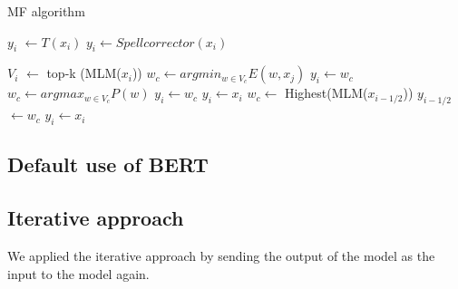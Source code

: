 \begin{algorithm}[t]
\caption{MF algorithm}
\label{alg:mf}
\begin{algorithmic}[1]
		\STATE $y_i$  $\longleftarrow T(x_i)$\;
	        \STATE $y_i\longleftarrow Spellcorrector(x_i)$\;
	               
	    \ELSE
	        \STATE $V_i$  $\longleftarrow$ top-k (MLM($x_i$))\;
	        \STATE $w_c \longleftarrow argmin_{w\in V_c}E(w,x_j)$ \;
	        	\STATE $y_i \longleftarrow w_c$ \;
	        \ENDIF        
	        \STATE $w_c \longleftarrow argmax_{w\in V_c}P(w)$ \;
	        	\STATE $y_i \longleftarrow w_c$ \;
	        \ELSE
	            \STATE $y_i \longleftarrow x_i$
	        \ENDIF
	    \ENDIF
	    \STATE $w_c \longleftarrow$ Highest(MLM($x_{i-1/2}$))\;
	    	\STATE $y_{i-1/2}$ $ \longleftarrow w_c$ \;
	    \ELSE 
	    	\STATE $y_i \longleftarrow x_i$\;
	    \ENDIF
	\ENDIF
\ENDFOR
\end{algorithmic}
\end{algorithm}


\subsection{Default use of BERT} \label{sec:bert}






\subsection{Iterative approach}\label{sec:iterative}
We applied the iterative approach by sending the output of the model as the input to the model again.



